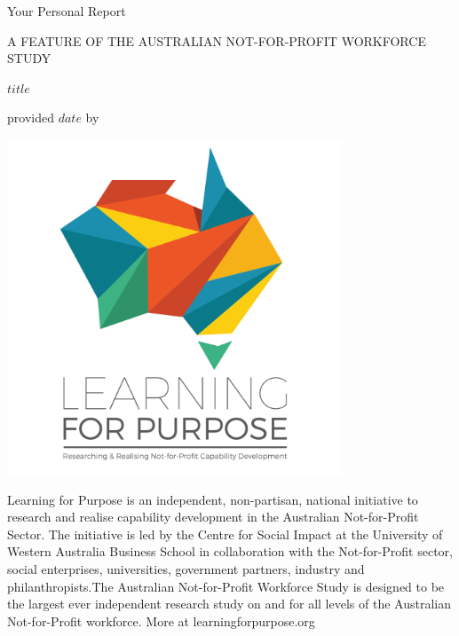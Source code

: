 \documentclass[11pt, a4paper]{article}
\begin{document}
\pagestyle{fancy}

\begin{titlepage}
	\centering
	
	{%
	  \fontsize{30pt}{30pt}\selectfont
	  Your Personal Report
	}%
	
	\vspace*{\baselineskip}
	
	{%
	  \fontsize{10pt}{10pt}\selectfont
	  A FEATURE OF THE AUSTRALIAN NOT-FOR-PROFIT WORKFORCE STUDY
	}%
	
	\vspace*{2\baselineskip}
	
	{%
		\fontsize{20pt}{20pt}\selectfont
		$title$
	}%
	
	\vspace*{\baselineskip}
	
	{\footnotesize provided $date$ by}
	
	\vspace*{2\baselineskip}
	
	\includegraphics[width=0.75\textwidth]{LFP_vertical_tagline.png}
	
	\vfill
	
  
  \raggedright
  {%
	  \footnotesize {}
	  Learning for Purpose is an independent, non-partisan, national initiative to research and realise capability development in the Australian Not-for-Profit Sector. The initiative is led by the Centre for Social Impact at the University of Western Australia Business School in collaboration with the Not-for-Profit sector, social enterprises, universities, government partners, industry and philanthropists.\newline \newline The Australian Not-for-Profit Workforce Study is designed to be the largest ever independent research study on and for all levels of the Australian Not-for-Profit workforce. More at learningforpurpose.org
	}%
	
	\thispagestyle{empty}
\end{titlepage}
\end{document}
